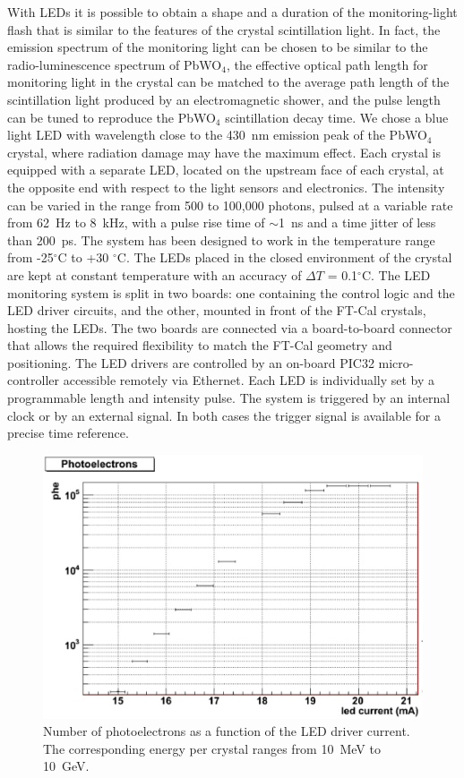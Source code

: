 With LEDs it is possible to obtain a shape and a duration of the monitoring-light flash that is similar to the features
of the crystal scintillation light. In fact, the emission spectrum of the monitoring light can be chosen to be similar to
the radio-luminescence spectrum of PbWO$_4$, the effective optical path length for monitoring light in the crystal
can be matched to the average path length of the scintillation light produced by an electromagnetic shower, and the
pulse length can be tuned to reproduce the PbWO$_4$ scintillation decay time. We chose a blue light LED with
wavelength close to the 430~nm emission peak of the PbWO$_4$ crystal, where radiation damage may have the
maximum effect. Each crystal is equipped with a separate LED, located on the upstream face of each crystal, at the
opposite end with respect to the light sensors and electronics. The intensity can be varied in the range from 500 to
100,000 photons, pulsed at a variable rate from 62~Hz to 8~kHz, with a pulse rise time of $\sim$1~ns and a time
jitter of less than 200~ps. The system has been designed to work in the temperature range from -25$^\circ$C
to +30 $^\circ$C. The LEDs placed in the closed environment of the crystal are kept at constant temperature with an
accuracy of $\Delta T$ = 0.1$^\circ$C. The LED monitoring system is split in two boards: one containing the control
logic and the LED driver circuits, and the other, mounted in front of the FT-Cal crystals, hosting the LEDs. The two
boards are connected via a board-to-board connector that allows the required flexibility to match the FT-Cal
geometry and positioning. The LED drivers are controlled by an on-board PIC32 micro-controller accessible remotely
via Ethernet. Each LED is individually set by a programmable length and intensity pulse. The system is triggered by
an internal clock or by an external signal. In both cases the trigger signal is available for a precise time reference. 

\begin{figure}[th!]
\centering 
\includegraphics[width=1.0\columnwidth]{./fig/dynamics.eps}
\caption{Number of photoelectrons as a function of the LED driver current. The corresponding energy per crystal
  ranges from 10~MeV to 10~GeV.}
\label{fig:LEDperf1} 
\end{figure}

